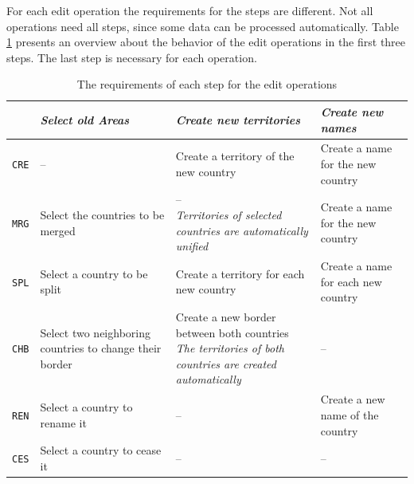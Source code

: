 For each edit operation the requirements for the steps are different. Not all operations need all steps, since some data can be processed automatically. Table \ref{tab:editoperations_in_worklow} presents an overview about the behavior of the edit operations in the first three steps. The last step is necessary for each operation.


\vspace{1em}
\begin{table}[H]
\begin{center}
\begin{tabular}{m{0.9cm} m{4.2cm} m{4.2cm} m{3.5cm}}
  \toprule

  &
  \emph{Select old Areas} &
  \emph{Create new territories} &
  \emph{Create new names} \\

  \midrule
  \texttt{CRE} &
  -- &
  Create a territory of the new country &
  Create a name for the new country \\

  \midrule
  \texttt{MRG} &
  Select the countries to be merged &
  \pbox{4.4cm}{--\\
  \emph{Territories of selected countries are automatically unified}} &
  Create a name for the new country
  \\

  \midrule
  \texttt{SPL} &
  Select a country to be \mbox{split} &
  Create a territory for each new country &
  Create a name for each new country \\

  \midrule
  \texttt{CHB} &
  Select two neighboring countries to change their border &
  \pbox{4.4cm}{Create a new border between both countries \\
  \emph{The territories of both countries are created automatically}}  &
  -- \\

  \midrule
  \texttt{REN} &
  Select a country to rename it &
  -- &
  Create a new name of the country \\

  \midrule
  \texttt{CES} &
  Select a country to cease it &
  -- &
  -- \\

  \bottomrule
\end{tabular}
\caption{The requirements of each step for the edit operations}
\label{tab:editoperations_in_worklow}
\end{center}
\end{table}

